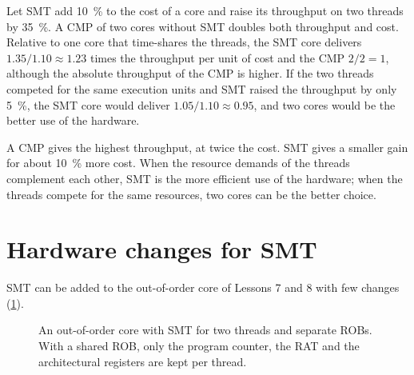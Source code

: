 \documentclass[../main.tex]{subfiles}
\begin{document}
\begin{example}
  \label{ex:l18-smt-cmp}
  Let SMT add \SI{10}{\percent} to the cost of a core and raise its
  throughput on two threads by \SI{35}{\percent}.  A CMP of two cores
  without SMT doubles both throughput and cost.  Relative to one core that
  time-shares the threads, the SMT core delivers $1.35/1.10\approx 1.23$
  times the throughput per unit of cost and the CMP $2/2=1$, although the
  absolute throughput of the CMP is higher.  If the two threads competed for
  the same execution units and SMT raised the throughput by only
  \SI{5}{\percent}, the SMT core would deliver $1.05/1.10\approx 0.95$, and
  two cores would be the better use of the hardware.
\end{example}

\begin{keypoint}
  A CMP gives the highest throughput, at twice the cost.  SMT gives a
  smaller gain for about \SI{10}{\percent} more cost.  When the resource
  demands of the threads complement each other, SMT is the more efficient
  use of the hardware; when the threads compete for the same resources, two
  cores can be the better choice.
\end{keypoint}

\section{Hardware changes for SMT}
\label{sec:l18-smt-hw}

SMT can be added to the out-of-order core of Lessons 7 and 8 with few
changes (\cref{fig:l18-smt-hw}).

\begin{figure}[htbp]
  \centering
  
  \caption{An out-of-order core with SMT for two threads and separate ROBs.
    With a shared ROB, only the program counter, the RAT and the
    architectural registers are kept per thread.}
  \label{fig:l18-smt-hw}
\end{figure}
\end{document}
